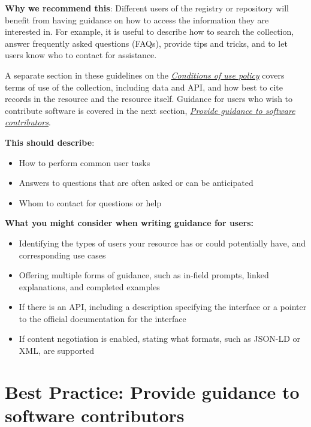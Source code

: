 \documentclass[11pt]{article}
\begin{document}
\textbf{Why we recommend this}: Different users of the registry or repository will benefit from having guidance on how to access the information they are interested in. For example, it is useful to describe how to search the collection, answer frequently asked questions (FAQs), provide tips and tricks, and to let users know who to contact for assistance.

A separate section in these guidelines on the \hyperref[best-practice-stipulate-conditions-of-use]{\emph{Conditions of use policy}} covers terms of use of the collection, including data and API, and how best to cite records in the resource and the resource itself. Guidance for users who wish to contribute software is covered in the next section, \hyperref[best-practice-provide-guidance-to-software-contributors]{\emph{Provide guidance to software contributors}}.

\textbf{This should describe}:

\begin{itemize}
\item How to perform common user tasks

\item Answers to questions that are often asked or can be anticipated

\item Whom to contact for questions or help

\end{itemize}

\textbf{What you might consider when writing guidance for users:}

\begin{itemize}
\item Identifying the types of users your resource has or could potentially have, and corresponding use cases

\item Offering multiple forms of guidance, such as in-field prompts, linked explanations, and completed examples

\item If there is an API, including a description specifying the interface or a pointer to the official documentation for the interface

\item If content negotiation is enabled, stating what formats, such as JSON-LD or XML, are supported

\end{itemize}


\section{Best Practice: Provide guidance to software contributors}
\label{best-practice-provide-guidance-to-software-contributors}
\end{document}
